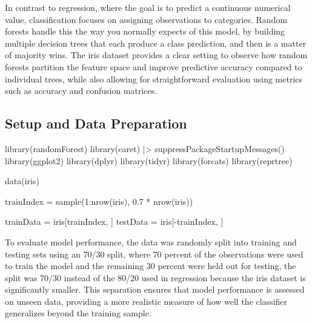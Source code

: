 \documentclass[
  11pt,
  letterpaper,
]{article}
\newenvironment{Shaded}{\begin{snugshade}}{\end{snugshade}}
\newcommand{\DecValTok}[1]{\textcolor[rgb]{0.68,0.00,0.00}{#1}}
\newcommand{\FloatTok}[1]{\textcolor[rgb]{0.68,0.00,0.00}{#1}}
\newcommand{\FunctionTok}[1]{\textcolor[rgb]{0.28,0.35,0.67}{#1}}
\newcommand{\NormalTok}[1]{\textcolor[rgb]{0.00,0.23,0.31}{#1}}
\newcommand{\OtherTok}[1]{\textcolor[rgb]{0.00,0.23,0.31}{#1}}
\newcommand{\SpecialCharTok}[1]{\textcolor[rgb]{0.37,0.37,0.37}{#1}}
\begin{document}
In contrast to regression, where the goal is to predict a continuous
numerical value, classification focuses on assigning observations to
categories. Random forests handle this the way you normally expects of
this model, by building multiple decision trees that each produce a
class prediction, and then is a matter of majority wins. The iris
dataset provides a clear setting to observe how random forests partition
the feature space and improve predictive accuracy compared to individual
trees, while also allowing for straightforward evaluation using metrics
such as accuracy and confusion matrices.

\subsection{Setup and Data
Preparation}\label{setup-and-data-preparation-1}

\begin{Shaded}
\begin{Highlighting}[]
\FunctionTok{library}\NormalTok{(randomForest) }
\FunctionTok{library}\NormalTok{(caret) }\SpecialCharTok{|\textgreater{}} \FunctionTok{suppressPackageStartupMessages}\NormalTok{()}
\FunctionTok{library}\NormalTok{(ggplot2)}
\FunctionTok{library}\NormalTok{(dplyr)}
\FunctionTok{library}\NormalTok{(tidyr)}
\FunctionTok{library}\NormalTok{(forcats)}
\FunctionTok{library}\NormalTok{(reprtree)}

\FunctionTok{data}\NormalTok{(iris)}

\NormalTok{trainIndex }\OtherTok{=} \FunctionTok{sample}\NormalTok{(}\DecValTok{1}\SpecialCharTok{:}\FunctionTok{nrow}\NormalTok{(iris), }\FloatTok{0.7} \SpecialCharTok{*} \FunctionTok{nrow}\NormalTok{(iris))}

\NormalTok{trainData }\OtherTok{=}\NormalTok{ iris[trainIndex, ]}
\NormalTok{testData }\OtherTok{=}\NormalTok{ iris[}\SpecialCharTok{{-}}\NormalTok{trainIndex, ]}
\end{Highlighting}
\end{Shaded}

To evaluate model performance, the data was randomly split into training
and testing sets using an 70/30 split, where 70 percent of the
observations were used to train the model and the remaining 30 percent
were held out for testing, the split was 70/30 instead of the 80/20 used
in regression because the iris dataset is significantly smaller. This
separation ensures that model performance is assessed on unseen data,
providing a more realistic measure of how well the classifier
generalizes beyond the training sample.
\end{document}
